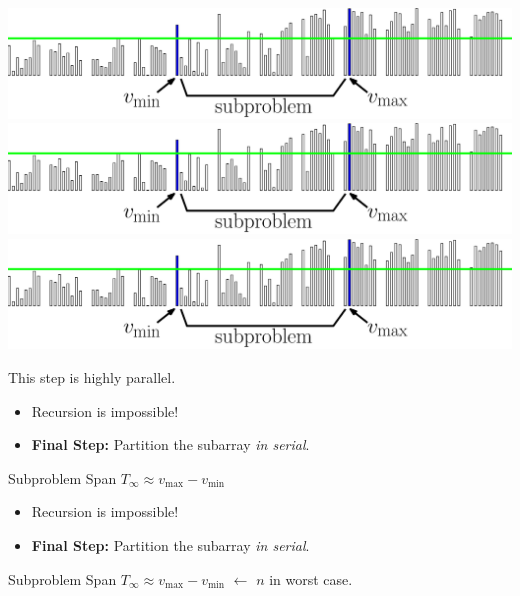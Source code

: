 \documentclass[xcolor=x11names, svgnames, rgb]{beamer}
\begin{document}
\begin{frame}[t]{}
\begin{overprint}
	\includegraphics[width=\linewidth]{imgs/stridedAlgSim/stridedAlgSim_45.eps}
	\onslide<7>\includegraphics[width=\linewidth]{imgs/stridedAlgSim/stridedAlgSim_45.eps}
	\onslide<8>\includegraphics[width=\linewidth]{imgs/stridedAlgSim/stridedAlgSim_45.eps}
	\end{overprint}
	\vspace{0.25cm}
	\begin{overprint}
	This step is highly parallel.
 \begin{itemize} \item Recursion is impossible!  \item \textbf{Final Step: }Partition the subarray \emph{in serial}.  \end{itemize} \vspace{1cm} Subproblem Span $T_\infty \approx v_{\max} - v_{\min}$
 \begin{itemize} \item Recursion is impossible!  \item \textbf{Final Step: }Partition the subarray \emph{in serial}.  \end{itemize} \vspace{1cm} Subproblem Span $T_\infty \approx v_{\max} - v_{\min}$ {\color{blue} $\longleftarrow \,\, n $ in worst case.}
	\end{overprint}
\end{frame}
\end{document}
